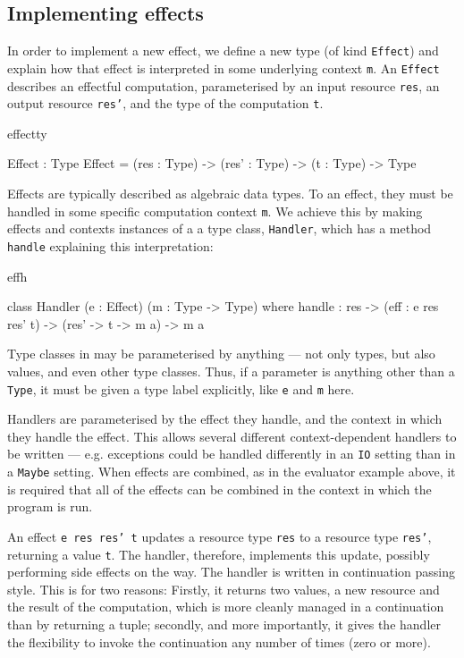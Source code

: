 \subsection{Implementing effects}

In order to implement a new effect, we define a new type (of kind \texttt{Effect})
and explain how that effect is interpreted in some underlying context
\texttt{m}. An \texttt{Effect} describes an effectful computation,
parameterised by an input resource \texttt{res}, an output resource \texttt{res'}, 
and the type of the computation \texttt{t}.

\begin{SaveVerbatim}{effectty}

Effect : Type
Effect = (res : Type) -> (res' : Type) -> 
         (t : Type) -> Type

\end{SaveVerbatim}

\noindent
Effects are typically described as algebraic data types. To  an
effect, they must be handled in some specific computation context \texttt{m}.
We achieve this by making effects and contexts instances of a a type class,
\texttt{Handler}, which has a method \texttt{handle} explaining this
interpretation:

\begin{SaveVerbatim}{effh}

class Handler (e : Effect) (m : Type -> Type) where
     handle : res -> (eff : e res res' t) -> 
              (res' -> t -> m a) -> m a

\end{SaveVerbatim}

\noindent
Type classes in \Idris{} may be parameterised by anything --- not only types,
but also values, and even other type classes. Thus, if a parameter is anything
other than a \texttt{Type}, it must be given a type label explicitly, like
\texttt{e} and \texttt{m} here.

Handlers are parameterised by the effect they handle, and the context in which
they handle the effect. This allows several different context-dependent
handlers to be written --- e.g. exceptions could be handled differently in an
\texttt{IO} setting than in a \texttt{Maybe} setting. When effects are combined,
as in the evaluator example above, it is required that all of the effects
can be combined in the context in which the program is run.

An effect \texttt{e res res' t} updates a resource type \texttt{res} to a
resource type \texttt{res'}, returning a value \texttt{t}. The handler, therefore,
implements this update, possibly performing side effects on the way.
The handler is written in continuation passing style. This is for two reasons:
Firstly, it returns two values, a new resource and the result of the computation,
which is more cleanly managed in a continuation than by returning a tuple;
secondly, and more importantly, it gives the handler the flexibility to invoke
the continuation any number of times (zero or more).

